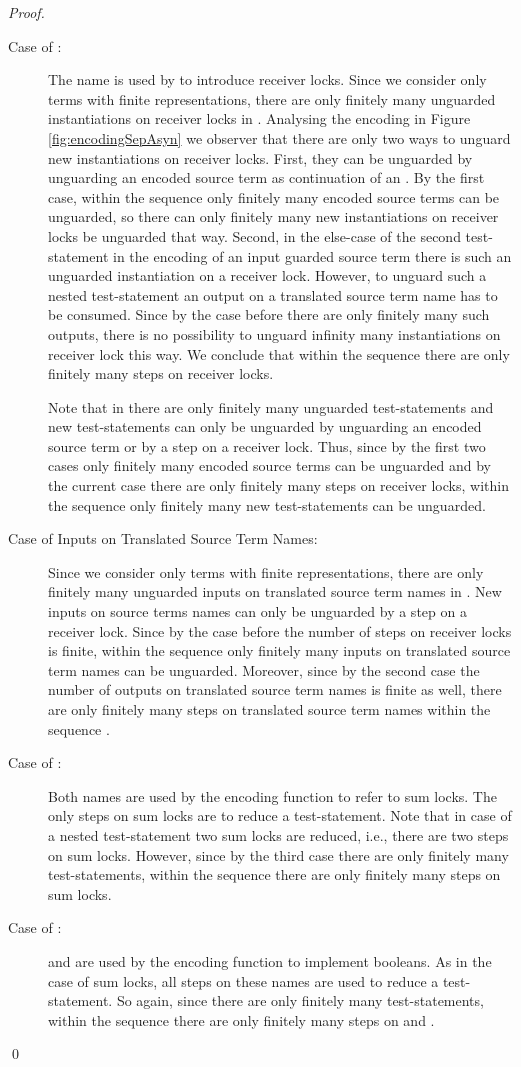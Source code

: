\documentclass[]{llncs}
\begin{document}
\begin{proof}
\begin{description}
		\item[Case of :] The name  is used by  to introduce receiver locks. Since we consider only terms with finite representations, there are only finitely many unguarded instantiations on receiver locks in . Analysing the encoding in Figure \ref{fig:encodingSepAsyn} we observer that there are only two ways to unguard new instantiations on receiver locks. First, they can be unguarded by unguarding an encoded source term as continuation of an \simulation. By the first case, within the sequence  only finitely many encoded source terms can be unguarded, so there can only finitely many new instantiations on receiver locks be unguarded that way. Second, in the else-case of the second test-statement in the encoding of an input guarded source term there is such an unguarded instantiation on a receiver lock. However, to unguard such a nested test-statement an output on a translated source term name has to be consumed. Since by the case before there are only finitely many such outputs, there is no possibility to unguard infinity many instantiations on receiver lock this way. We conclude that within the sequence  there are only finitely many steps on receiver locks.
			
			Note that in  there are only finitely many unguarded test-statements and new test-statements can only be unguarded by unguarding an encoded source term or by a step on a receiver lock. Thus, since by the first two cases only finitely many encoded source terms can be unguarded and by the current case there are only finitely many steps on receiver locks, within the sequence  only finitely many new test-statements can be unguarded.
		\item[Case of Inputs on Translated Source Term Names:] Since we consider only terms with finite representations, there are only finitely many unguarded inputs on translated source term names in . New inputs on source terms names can only be unguarded by a step on a receiver lock. Since by the case before the number of steps on receiver locks is finite, within the sequence  only finitely many inputs on translated source term names can be unguarded. Moreover, since by the second case the number of outputs on translated source term names is finite as well, there are only finitely many steps on translated source term names within the sequence .
		\item[Case of :] Both names are used by the encoding function to refer to sum locks. The only steps on sum locks are to reduce a test-statement. Note that in case of a nested test-statement two sum locks are reduced, i.e., there are two steps on sum locks. However, since by the third case there are only finitely many test-statements, within the sequence  there are only finitely many steps on sum locks.
		\item[Case of :]  and  are used by the encoding function to implement booleans. As in the case of sum locks, all steps on these names are used to reduce a test-statement. So again, since there are only finitely many test-statements, within the sequence  there are only finitely many steps on  and .
	\end{description}
	\qed
\end{proof}
\end{document}
